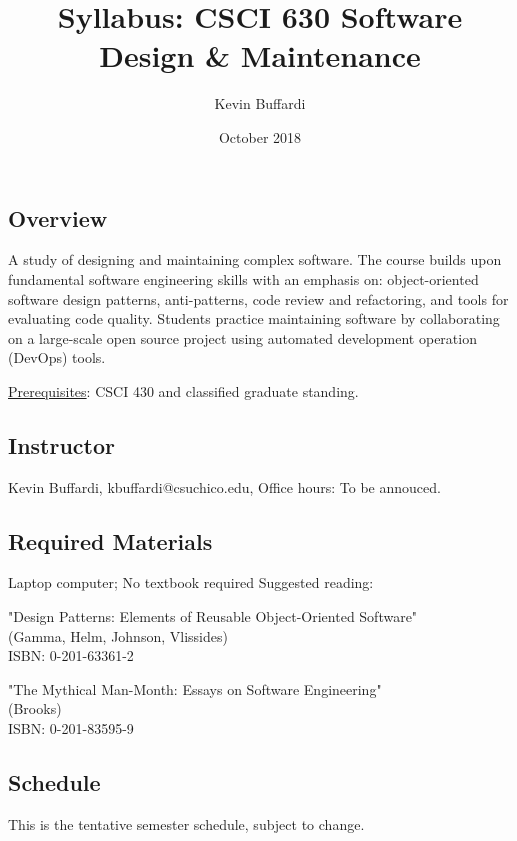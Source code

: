 \documentclass[12pt]{article}
\title{Syllabus: CSCI 630 Software Design \& Maintenance}
\author{Kevin Buffardi}
\date{October 2018}
\begin{document}
  \maketitle
  \subsection*{Overview}	 
  \noindent
  A study of designing and maintaining complex software. The course builds upon fundamental software engineering skills with an emphasis on: object-oriented software design patterns, anti-patterns, code review and refactoring, and tools for evaluating code quality. Students practice maintaining software by collaborating on a large-scale open source project using automated development operation (DevOps) tools.

  \underline{Prerequisites}: CSCI 430 and classified graduate standing.
  
  \subsection*{Instructor}
  \noindent
  Kevin Buffardi, kbuffardi@csuchico.edu, Office hours: To be annouced.

  \subsection*{Required Materials}
  \noindent
  Laptop computer; No textbook required
  \noindent
  Suggested reading: 
  
  \smallskip
  \noindent
  "Design Patterns: Elements of Reusable Object-Oriented Software"\\
  (Gamma, Helm, Johnson, Vlissides)\\
  ISBN: 0-201-63361-2
  
  \smallskip
  \noindent
  "The Mythical Man-Month: Essays on Software Engineering"\\
  (Brooks)\\
  ISBN: 0-201-83595-9

  \subsection*{Schedule}
  \noindent
  This is the tentative semester schedule, subject to change.
\end{document}
